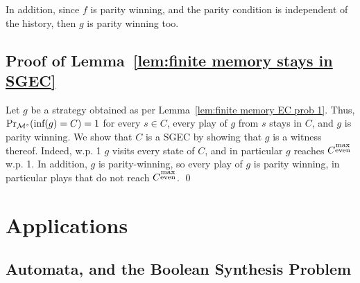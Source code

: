 \documentclass[runningheads,a4paper]{llncs}
\newcommand{\zug}[1]{\langle #1  \rangle}
\newcommand{\T}{{\mathcal T}}
\newcommand{\stam}[1]{}
\newcommand{\M}{{\cal M}}
\newcommand{\Inf}{\mbox{inf}}
\newcommand{\tIN}{{2^I}}
\newcommand{\tOUT}{{2^O}}
\newcommand{\tINo}{{{(2^I)}^\omega}}
\newcommand{\tOUTo}{{{(2^O)}^\omega}}
\newcommand{\sgec}{{SGEC}\xspace}
\newcommand{\me}{{\substack{\rm max\\ \rm even}}}
\begin{document}
In addition, since $f$ is parity winning, and the parity condition is independent of the history, then $g$ is parity winning too.


\subsection{Proof of Lemma~\ref{lem:finite memory stays in SGEC}}
\label{apx:finite memory stays in SGEC}
Let $g$ be a strategy obtained as per Lemma~\ref{lem:finite memory EC prob 1}. Thus, $\Pr_{\M^s}(\Inf(g)=C)=1$ for every $s\in C$,  every play of $g$ from $s$ stays in $C$, and $g$ is parity winning. We show that $C$ is a \sgec by showing that $g$ is a witness thereof.
Indeed, w.p. 1 $g$ visits every state of $C$, and in particular $g$ reaches $C^{\me}$ w.p. 1. In addition, $g$ is parity-winning, so every play of $g$ is parity winning, in particular plays that do not reach $C^{\me}$.
\qed

\section{Applications}
\label{app app}

\subsection{Automata, and the Boolean Synthesis Problem}
\label{sec:application defs}
\stam{
For finite sets $I$ and $O$ of input and output signals, respectively, an {\em $I/O$  transducer} is $\T=\zug{I,O,Q,q_0,\delta,\rho}$, where $Q$ is a set of states, $q_0 \in Q$ is an initial state, $\delta: Q\times \tIN \to Q$ is a total (deterministic) transition function, and $\rho:Q\to \tOUT$ is a labeling function on the states. The run of $\T$ on a word $w=i_0 \cdot i_1 \cdots \in \tINo$ is the sequence of states $q_0,q_1,\ldots$ such that $q_{k+1} = \delta(q_k,i_{k})$ for all $k \geq 0$. The {\em output} of $\T$ on $w$ is then $o_1,o_2,\ldots\in \tOUTo$ where $o_k=\rho(q_{k})$ for all $k\ge 1$. Note that the first output assignment is that of $q_1$, and we do not consider $\rho(q_0)$. This reflects the fact that the environment initiates the interaction. The {\em computation of $\T$ on $w$\/} is then 
$\T(w)=i_0\cup o_1,i_1\cup o_2,\ldots \in (2^{I \cup O})^\omega$.
When $Q$ is a finite set, we say that the transducer is  finite.

The synthesis problem gets as input a specification $L \subseteq (2^{I \cup O})^\omega$ and generates a transducer $\T$ that realizes $L$; namely, all the computations of $\T$ are in $L$. The language $L$ is typically given by an LTL formula \cite{Pnu81} or by means of an automaton of infinite words. 
}
\end{document}
